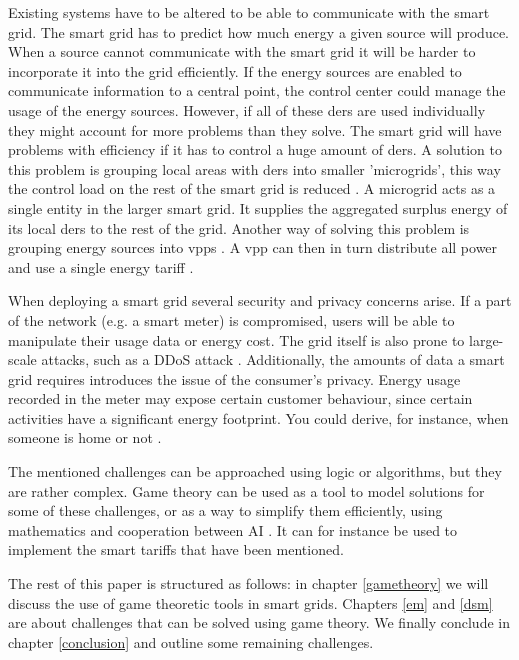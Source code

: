 Existing systems have to be altered to be able to communicate with the smart grid.  The smart grid has to predict how much energy a given source will produce. When a source cannot communicate with the smart grid it will be harder to incorporate it into the grid efficiently. If the energy sources are enabled to communicate information to a central point, the control center could manage the usage of the energy sources. However, if all of these \acp{der}  are used individually they might account for more problems than they solve. The smart grid will have problems with efficiency if it has to control a huge amount of \acp{der}. A solution to this problem is grouping local areas with \acp{der} into smaller 'microgrids', this way the control load on the rest of the smart grid is reduced \cite{HatziargyriouAsanoIravaniMarnay2007}. A microgrid acts as a single entity in the larger smart grid. It supplies the aggregated surplus energy of its local \acp{der} to the rest of the grid. Another way of solving this problem is grouping energy sources into \acp{vpp} . A \ac{vpp} can then in turn distribute all power and use a single energy tariff \cite{NikonowiczMilewski2012}.

When deploying a smart grid several security and privacy concerns arise.  If a part of the network (e.g. a smart meter) is compromised, users will be able to manipulate their usage data or energy cost. The grid itself is also prone to large-scale attacks, such as a DDoS attack \cite{McDanielMcLaughlin2009a}. Additionally, the amounts of data a smart grid requires introduces the issue of the consumer's privacy. Energy usage recorded in the meter may expose certain customer behaviour, since certain activities have a significant energy footprint. You could derive, for instance, when someone is home or not \cite{Molina-MarkhamShenoyFuEtAl2010}. 

The mentioned challenges can be approached using logic or algorithms, but they are rather complex. Game theory can be used as a tool to model solutions for some of these challenges, or as a way to simplify them efficiently, using mathematics and cooperation between AI \cite{myerson2013game}. It can for instance be used to implement the smart tariffs that have been mentioned. 

The rest of this paper is structured as follows: in chapter \ref{gametheory} we will discuss the use of game theoretic tools in smart grids. Chapters \ref{em} and \ref{dsm} are about challenges that can be solved using game theory. We finally conclude in chapter \ref{conclusion} and outline some remaining challenges.